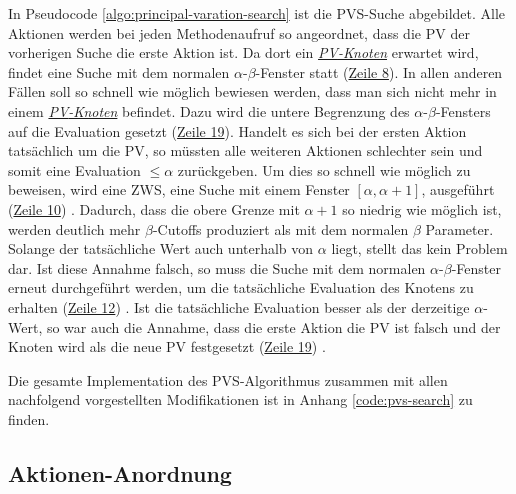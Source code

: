 \endgroup

In Pseudocode \ref{algo:principal-varation-search} ist die \ac{PVS}-Suche abgebildet. Alle Aktionen werden bei jeden Methodenaufruf so angeordnet, dass die \acl{PV} der vorherigen Suche die erste Aktion ist. Da dort ein \hyperref[text:pv-node]{\emph{\acs{PV}-Knoten}} erwartet wird, findet eine Suche mit dem normalen $\alpha$-$\beta$-Fenster statt (\hyperref[alg:pvs-line-8]{Zeile 8}). In allen anderen Fällen soll so schnell wie möglich bewiesen werden, dass man sich nicht mehr in einem \hyperref[text:pv-node]{\emph{\acs{PV}-Knoten}} befindet. Dazu wird die untere Begrenzung des $\alpha$-$\beta$-Fensters auf die Evaluation gesetzt (\hyperref[alg:pvs-line-19]{Zeile 19}). Handelt es sich bei der ersten Aktion tatsächlich um die \acl{PV}, so müssten alle weiteren Aktionen schlechter sein und somit eine Evaluation $\le \alpha$ zurückgeben. Um dies so schnell wie möglich zu beweisen, wird eine \acf{ZWS}, eine Suche mit einem Fenster $\left[\alpha, \alpha + 1\right]$, ausgeführt (\hyperref[alg:pvs-line-10]{Zeile 10}) \cite[S. 317]{2005.EnhancedForwardPruning}. Dadurch, dass die obere Grenze mit $\alpha + 1$ so niedrig wie möglich ist, werden deutlich mehr $\beta$-Cutoffs produziert als mit dem normalen $\beta$ Parameter. Solange der tatsächliche Wert auch unterhalb von $\alpha$ liegt, stellt das kein Problem dar. Ist diese Annahme falsch, so muss die Suche mit dem normalen $\alpha$-$\beta$-Fenster erneut durchgeführt werden, um die tatsächliche Evaluation des Knotens zu erhalten (\hyperref[alg:pvs-line-12]{Zeile 12}) \cite{2002.PrincipalVariationSearch}. Ist die tatsächliche Evaluation besser als der derzeitige $\alpha$-Wert, so war auch die Annahme, dass die erste Aktion die \acl{PV} ist falsch und der Knoten wird als die neue \acl{PV} festgesetzt (\hyperref[alg:pvs-line-19]{Zeile 19}) \cite[S. 5]{1999.SolutionTreesGameTreeSearch}.

\vspace*{-5cm}

\pagebreak

Die gesamte Implementation des \ac{PVS}-Algorithmus zusammen mit allen nachfolgend vorgestellten Modifikationen ist in Anhang \ref{code:pvs-search} zu finden.

\subsection{Aktionen-Anordnung}

